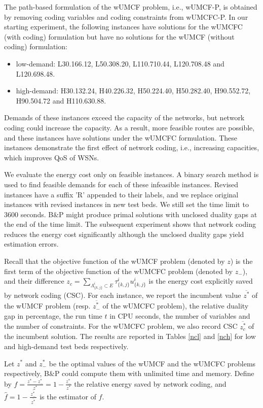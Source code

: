 The path-based formulation of the wUMCF problem, i.e., {wUMCF}-P, is obtained by removing coding variables and coding constraints from wUMCFC-P. In our starting experiment, the following instances have solutions for the  wUMCFC (with coding) formulation but have no solutions for the wUMCF (without coding) formulation:
\begin{itemize}
    \item low-demand: L30.166.12, L50.308.20, L110.710.44, L120.708.48 and  L120.698.48.
    \item high-demand: H30.132.24, H40.226.32, H50.224.40, H50.282.40, H90.552.72, H90.504.72 and H110.630.88.
\end{itemize}
Demands of these instances exceed the capacity of the networks, but network coding could increase the capacity. As a result, more feasible routes are possible, and these instances have solutions under the wUMCFC formulation. These instances demonstrate the first effect of network coding, i.e., increasing capacities, which improves QoS of WSNs.

We evaluate the energy cost only on feasible instances. A binary search method is used to find feasible demands for each of these infeasible instances. Revised instances have a suffix 'R' appended to their labels, and we replace original instances with revised instances in new test beds.
 We still set the time limit to 3600 seconds. B\(\&\)P might produce primal solutions with unclosed duality gaps at the end of the time limit. The subsequent experiment shows that network coding reduces the energy cost significantly although the unclosed duality gaps yield estimation errors.
 
 Recall that the objective function of the wUMCF problem (denoted by \(z\)) is the first term of the objective function of  the wUMCFC problem (denoted by \(z_{-}\)), and their difference \( z_{c} = \displaystyle \sum_{\Lambda^i_{\{k,j\}} \subset E}   \tau^i_{\{k,j\}}u^i_{\{k,j\}} \)  is the energy cost explicitly saved by network coding (CSC).
 For each instance, we report the incumbent value \(\overline{z^*}\) of the wUMCF problem (resp. \(\overline{z_{-}^*}\) of the wUMCFC problem), the relative duality gap in percentage, the run time \(t\) in CPU seconds, the number of variables and the number of constraints.  For the wUMCFC problem, we also record CSC \(\overline{z_c^*}\) of the incumbent solution.
 The results are reported in Tables \eqref{ncl} and \eqref{nch} for low and high-demand test beds respectively.

Let \(z^*\) and \(z_{-}^*\) be  the optimal values of the wUMCF and the wUMCFC problems  respectively, B\(\&\)P could compute them with unlimited time and memory.  Define by \(f = \frac{z^* - z_{-}^*}{z^*} = 1 - \frac{z_{-}^*}{z^*} \) the relative energy saved by network coding, and \(\hat{f}= 1 - \frac{\, \overline{z_{-}^*}\,}{\,\overline{z^*}\,} \) is  the estimator of \(f\).

